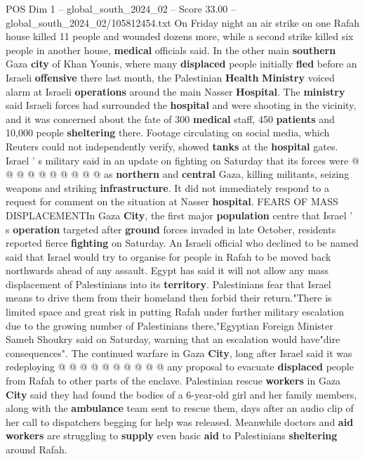 \begin{textsample}{POS Dim 1 – global\_south\_2024\_02 – Score 33.00 – global\_south\_2024\_02/105812454.txt}
On Friday night an air strike on one Rafah house killed 11 people and wounded dozens more, while a second strike killed six people in another house, \textbf{medical} officials said.
In the other main \textbf{southern} Gaza \textbf{city} of Khan Younis, where many \textbf{displaced} people initially \textbf{fled} before an Israeli \textbf{offensive} there last month, the Palestinian \textbf{Health} \textbf{Ministry} voiced alarm at Israeli \textbf{operations} around the main Nasser \textbf{Hospital}.
The \textbf{ministry} said Israeli forces had surrounded the \textbf{hospital} and were shooting in the vicinity, and it was concerned about the fate of 300 \textbf{medical} staff, 450 \textbf{patients} and 10,000 people \textbf{sheltering} there.
Footage circulating on social media, which Reuters could not independently verify, showed \textbf{tanks} at the \textbf{hospital} gates.
Israel ' s military said in an update on fighting on Saturday that its forces were @ @ @ @ @ @ @ @ @ @ as \textbf{northern} and \textbf{central} Gaza, killing militants, seizing weapons and striking \textbf{infrastructure}.
It did not immediately respond to a request for comment on the situation at Nasser \textbf{hospital}.
FEARS OF MASS DISPLACEMENTIn Gaza \textbf{City}, the first major \textbf{population} centre that Israel ' s \textbf{operation} targeted after \textbf{ground} forces invaded in late October, residents reported fierce \textbf{fighting} on Saturday.
An Israeli official who declined to be named said that Israel would try to organise for people in Rafah to be moved back northwards ahead of any assault.
Egypt has said it will not allow any mass displacement of Palestinians into its \textbf{territory}.
Palestinians fear that Israel means to drive them from their homeland then forbid their return."There is limited space and great risk in putting Rafah under further military escalation due to the growing number of Palestinians there,"Egyptian Foreign Minister Sameh Shoukry said on Saturday, warning that an escalation would have"dire consequences".
The continued warfare in Gaza \textbf{City}, long after Israel said it was redeploying @ @ @ @ @ @ @ @ @ @ any proposal to evacuate \textbf{displaced} people from Rafah to other parts of the enclave.
Palestinian rescue \textbf{workers} in Gaza \textbf{City} said they had found the bodies of a 6-year-old girl and her family members, along with the \textbf{ambulance} team sent to rescue them, days after an audio clip of her call to dispatchers begging for help was released.
Meanwhile doctors and \textbf{aid} \textbf{workers} are struggling to \textbf{supply} even basic \textbf{aid} to Palestinians \textbf{sheltering} around Rafah.

\end{textsample}
